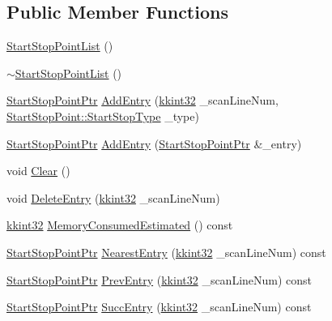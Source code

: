\subsection*{Public Member Functions}
\begin{DoxyCompactItemize}
\item 
\hyperlink{class_k_k_l_s_c_1_1_start_stop_point_list_af5716441874bf97b20a4af90de644e51}{Start\+Stop\+Point\+List} ()
\item 
\hyperlink{class_k_k_l_s_c_1_1_start_stop_point_list_a74e7da80de62632b4ab72b80d72efa76}{$\sim$\+Start\+Stop\+Point\+List} ()
\item 
\hyperlink{namespace_k_k_l_s_c_ad7242c9e21790e237095cdd24ce21361}{Start\+Stop\+Point\+Ptr} \hyperlink{class_k_k_l_s_c_1_1_start_stop_point_list_a7e80f794e5303676f2223bcb05b98bac}{Add\+Entry} (\hyperlink{namespace_k_k_b_a8fa4952cc84fda1de4bec1fbdd8d5b1b}{kkint32} \+\_\+scan\+Line\+Num, \hyperlink{class_k_k_l_s_c_1_1_start_stop_point_aca5818602fc58bfe4c9794b311288680}{Start\+Stop\+Point\+::\+Start\+Stop\+Type} \+\_\+type)
\item 
\hyperlink{namespace_k_k_l_s_c_ad7242c9e21790e237095cdd24ce21361}{Start\+Stop\+Point\+Ptr} \hyperlink{class_k_k_l_s_c_1_1_start_stop_point_list_a92508c2eb672d7b7c521855004fd1d80}{Add\+Entry} (\hyperlink{namespace_k_k_l_s_c_ad7242c9e21790e237095cdd24ce21361}{Start\+Stop\+Point\+Ptr} \&\+\_\+entry)
\item 
void \hyperlink{class_k_k_l_s_c_1_1_start_stop_point_list_a882c0b0005b4a968ec82fc703070c113}{Clear} ()
\item 
void \hyperlink{class_k_k_l_s_c_1_1_start_stop_point_list_a3b4acff3e8bcabafa04c4a8b6995c8c9}{Delete\+Entry} (\hyperlink{namespace_k_k_b_a8fa4952cc84fda1de4bec1fbdd8d5b1b}{kkint32} \+\_\+scan\+Line\+Num)
\item 
\hyperlink{namespace_k_k_b_a8fa4952cc84fda1de4bec1fbdd8d5b1b}{kkint32} \hyperlink{class_k_k_l_s_c_1_1_start_stop_point_list_ac71af8b136ae0aab3f821d6445805353}{Memory\+Consumed\+Estimated} () const 
\item 
\hyperlink{namespace_k_k_l_s_c_ad7242c9e21790e237095cdd24ce21361}{Start\+Stop\+Point\+Ptr} \hyperlink{class_k_k_l_s_c_1_1_start_stop_point_list_a859388135258c3586ee14b65973e2ebe}{Nearest\+Entry} (\hyperlink{namespace_k_k_b_a8fa4952cc84fda1de4bec1fbdd8d5b1b}{kkint32} \+\_\+scan\+Line\+Num) const 
\item 
\hyperlink{namespace_k_k_l_s_c_ad7242c9e21790e237095cdd24ce21361}{Start\+Stop\+Point\+Ptr} \hyperlink{class_k_k_l_s_c_1_1_start_stop_point_list_af2533252e0942943b17b79b7602143b4}{Prev\+Entry} (\hyperlink{namespace_k_k_b_a8fa4952cc84fda1de4bec1fbdd8d5b1b}{kkint32} \+\_\+scan\+Line\+Num) const 
\item 
\hyperlink{namespace_k_k_l_s_c_ad7242c9e21790e237095cdd24ce21361}{Start\+Stop\+Point\+Ptr} \hyperlink{class_k_k_l_s_c_1_1_start_stop_point_list_ae0a76f6e2113b7e5d98bb3339a694d02}{Succ\+Entry} (\hyperlink{namespace_k_k_b_a8fa4952cc84fda1de4bec1fbdd8d5b1b}{kkint32} \+\_\+scan\+Line\+Num) const 
\end{DoxyCompactItemize}



